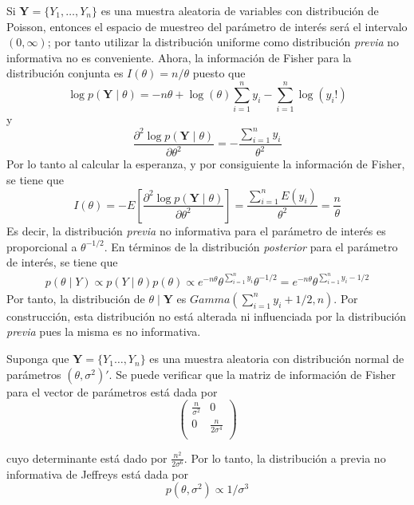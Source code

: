 \documentclass[10pt,openright]{book}\usepackage[]{graphicx}\usepackage[]{color}
\begin{document}
\begin{Eje}
\label{EjemPoisson}
Si $\mathbf{Y}=\{Y_1,\ldots,Y_n\}$ es una muestra aleatoria de variables con distribución de Poisson, entonces el espacio de muestreo del parámetro de interés será el intervalo $(0,\infty)$; por tanto utilizar la distribución uniforme como distribución \emph{previa} no informativa no es conveniente. Ahora, la información de Fisher para la distribución conjunta es $I(\theta)=n/\theta$ puesto que
\begin{equation*}
\log p(\mathbf{Y} \mid \theta)=-n\theta+\log(\theta)\sum_{i=1}^ny_i-\sum_{i=1}^n\log(y_i!)
\end{equation*}
y
\begin{equation*}
\frac{\partial^2 \log p(\mathbf{Y} \mid \theta)}{\partial\theta^2}=-\frac{\sum_{i=1}^ny_i}{\theta^2}
\end{equation*}
Por lo tanto al calcular la esperanza, y por consiguiente la información de Fisher, se tiene que
\begin{equation*}
I(\theta)=- E\left[\frac{\partial^2 \log p(\mathbf{Y} \mid \theta)}{\partial\theta^2}\right]
=\frac{\sum_{i=1}^nE(y_i)}{\theta^2}=\frac{n}{\theta}
\end{equation*}
Es decir, la distribución \emph{previa} no informativa para el parámetro de interés es proporcional a $\theta^{-1/2}$. En términos de la distribución \emph{posterior} para el parámetro de interés, se tiene que
\begin{align*}
p(\theta \mid Y) \propto p(Y \mid \theta) p(\theta) \propto e^{-n\theta} \theta^{\sum_{i=1}^ny_i}\theta^{-1/2}
=e^{-n\theta} \theta^{\sum_{i=1}^ny_i-1/2}
\end{align*}
Por tanto, la distribución de $\theta \mid \mathbf{Y}$ es $Gamma(\sum_{i=1}^ny_i+1/2,n)$. Por construcción, esta distribución no está alterada ni influenciada por la distribución \emph{previa} pues la misma es no informativa.
\end{Eje}

\begin{Eje}
Suponga que $\mathbf{Y}=\{Y_1\ldots, Y_n\}$ es una muestra aleatoria con distribución normal de parámetros $(\theta, \sigma^2)'$. Se puede verificar que la matriz de información de Fisher para el vector de parámetros está dada por
\begin{equation}
\begin{pmatrix}
  \frac{n}{\sigma^2} & 0 \\
  0 & \frac{n}{2\sigma^4} \\
\end{pmatrix}
\end{equation}

cuyo determinante está dado por $\frac{n^2}{2\sigma^6}$. Por lo tanto, la distribución a previa no informativa de Jeffreys está dada por
\begin{equation}
p(\theta,\sigma^2)\propto 1/\sigma^3
\end{equation}
\end{Eje}
\end{document}
